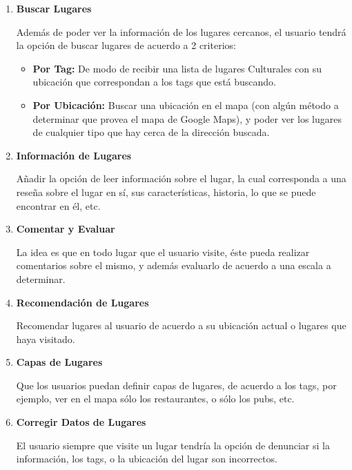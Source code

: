 \documentclass[10pt,letterpaper]{article}
\begin{document}
\begin{enumerate}

\item \textbf{Buscar Lugares}

Además de poder ver la información de los lugares cercanos, el usuario tendrá la opción de buscar lugares de acuerdo a 2 criterios:\\

\begin{itemize}
\item \textbf{Por Tag:} De modo de recibir una lista de lugares Culturales con su ubicación que correspondan a los tags que está buscando.
\item \textbf{Por Ubicación:} Buscar una ubicación en el mapa (con algún método a determinar que provea el mapa de Google Maps), y poder ver los lugares de cualquier tipo que hay cerca de la dirección buscada.
\end{itemize}

\item \textbf{Información de Lugares}

Añadir la opción de leer información sobre el lugar, la cual corresponda a una reseña sobre el lugar en sí, sus características, historia, lo que se puede encontrar en él, etc.\\

\item \textbf{Comentar y Evaluar}

La idea es que en todo lugar que el usuario visite, éste pueda realizar comentarios sobre el mismo, y además evaluarlo de acuerdo a una escala a determinar.\\

\item \textbf{Recomendación de Lugares}

Recomendar lugares al usuario de acuerdo a su ubicación actual o lugares que haya visitado.

\item \textbf{Capas de Lugares}

Que los usuarios puedan definir capas de lugares, de acuerdo a los tags, por ejemplo, ver en el mapa sólo los restaurantes, o sólo los pubs, etc.

\item \textbf{Corregir Datos de Lugares}

El usuario siempre que visite un lugar tendría la opción de denunciar si la información, los tags, o la ubicación del lugar son incorrectos.\\


\end{enumerate}
\end{document}
